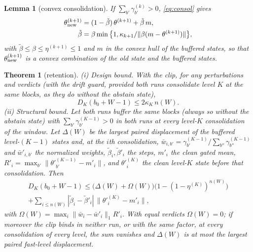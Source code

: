 \documentclass[journal]{IEEEtran}
\newtheorem{theorem}{Theorem}
\newtheorem{lemma}{Lemma}
\theoremstyle{remark}
\begin{document}
\begin{lemma}[convex consolidation]\label{lem:convex}
If $\sum_{b'}\gamma^{(k)}_{b'}>0$, \eqref{eq:consol} gives
\begin{equation}\label{eq:convex}
\begin{aligned}
\theta^{(k+1)}_{\rm new}&=(1-\tilde\beta)\,\theta^{(k+1)}+\tilde\beta\,m,\\
\tilde\beta&=\beta\min\big\{1,\kappa_{k+1}/\|\beta(m-\theta^{(k+1)})\|\big\},
\end{aligned}
\end{equation}
with $\tilde\beta\le\beta\le\eta^{(k+1)}\le1$ and $m$ in the convex hull of the buffered states, so that $\theta^{(k+1)}_{\rm new}$ is a convex
combination of the old state and the buffered states.
\end{lemma}

\begin{theorem}[retention]\label{thm:retention}
(i) \emph{Design bound.} With the clip, for any perturbations and verdicts (with the drift guard,
provided both runs consolidate level $K$ at the same blocks, as they do without the abstain state),
\begin{equation}\label{eq:design}
D_K(b_0+W-1)\le2\kappa_K\,n(W).
\end{equation}
(ii) \emph{Structural bound.} Let both runs buffer the same blocks (always so without the abstain
state) with $\sum_{b'}\gamma^{(K-1)}_{b'}>0$ in both runs at every level-$K$ consolidation of the window. Let
$\Delta(W)$ be the largest paired displacement of the buffered level-$(K{-}1)$ states and, at the $i$th
consolidation, $\bar w_{i,b'}=\gamma^{(K-1)}_{b'}/\sum_{b''}\gamma^{(K-1)}_{b''}$ and $\bar w'_{i,b'}$ the
normalized weights, $\tilde\beta_i,\tilde\beta'_i$ the steps, $m'_i$ the clean gated mean,
$R'_i=\max_{b'}\|\theta'^{(K-1)}_{b'}-m'_i\|$, and $\theta'^{(K)}_i$ the clean level-$K$ state before that consolidation. Then
\begin{multline}\label{eq:struct}
D_K(b_0+W-1)\le\big(\Delta(W)+\Omega(W)\big)\big(1-(1-\eta^{(K)})^{n(W)}\big)\\
+\sum_{i\le n(W)}|\tilde\beta_i-\tilde\beta'_i|\,\big\|\theta'^{(K)}_i-m'_i\big\|,
\end{multline}
with $\Omega(W)=\max_i\|\bar w_i-\bar w'_i\|_1R'_i$. With equal verdicts $\Omega(W)=0$; if moreover the
clip binds in neither run, or with the same factor, at every consolidation of every level, the sum vanishes and
$\Delta(W)$ is at most the largest paired fast-level displacement.
\end{theorem}
\end{document}
